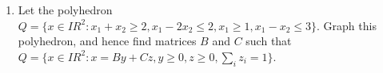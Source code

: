 \documentclass[12pt]{article}
\newcommand{\re}{I \!\! R}
\begin{document}
\begin{enumerate}
  \item  Let the polyhedron $Q=\{x \in {\re}^2: x_1+x_2 \geq 2, x_1 - 2x_2 \leq
            2,  x_1 \geq 1, x_1 - x_2 \leq 3 \}$.
            Graph this polyhedron, and hence find matrices $B$ and $C$ such that
            $Q = \{x \in {\re}^2: x = By + Cz,
                      y \geq 0, z \geq 0, \sum_i z_i = 1  \}$.

\end{enumerate}
\end{document}
